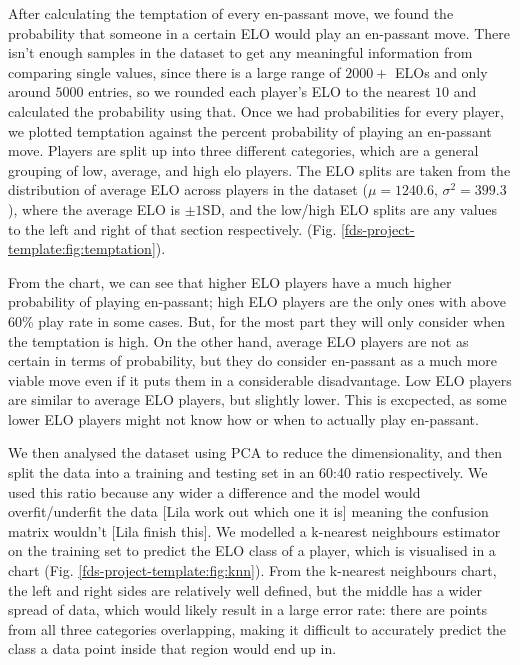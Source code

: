 \documentclass[10pt,a4paper,twocolumn]{article}
\begin{document}
After calculating the temptation of every en-passant move, we found the probability that someone in a certain ELO would play an en-passant move. There isn't enough samples in the dataset to get any meaningful information from comparing single values, since there is a large range of $2000+$ ELOs and only around $5000$ entries, so we rounded each player's ELO to the nearest $10$ and calculated the probability using that. Once we had probabilities for every player, we plotted temptation against the percent probability of playing an en-passant move. Players are split up into three different categories, which are a general grouping of low, average, and high elo players. The ELO splits are taken from the distribution of average ELO across players in the dataset ($\mu=1240.6,\,\sigma^{2}=399.3$), where the average ELO is $\pm 1\text{SD}$, and the low/high ELO splits are any values to the left and right of that section respectively. (Fig. \ref{fds-project-template:fig:temptation}).\newline

From the chart, we can see that higher ELO players have a much higher probability of playing en-passant; high ELO players are the only ones with above 60\% play rate in some cases.  But, for the most part they will only consider when the temptation is high. On the other hand, average ELO players are not as certain in terms of probability, but they do consider en-passant as a much more viable move even if it puts them in a considerable disadvantage. Low ELO players are similar to average ELO players, but slightly lower. This is excpected, as some lower ELO players might not know how or when to actually play en-passant. \newline

We then analysed the dataset using PCA to reduce the dimensionality, and then split the data into a training and testing set in an 60:40 ratio respectively. We used this ratio because any wider a difference and the model would overfit/underfit the data [Lila work out which one it is] meaning the confusion matrix wouldn't [Lila finish this]. We modelled a k-nearest neighbours estimator on the training set to predict the ELO class of a player, which is visualised in a chart (Fig. \ref{fds-project-template:fig:knn}). From the k-nearest neighbours chart, the left and right sides are relatively well defined, but the middle has a wider spread of data, which would likely result in a large error rate: there are points from all three categories overlapping, making it difficult to accurately predict the class a data point inside that region would end up in. \newline
\end{document}

